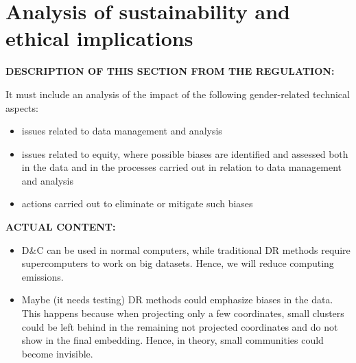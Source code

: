 \section{Analysis of sustainability and ethical implications}

\textbf{DESCRIPTION OF THIS SECTION FROM THE REGULATION:}

It must include an analysis of the impact of the following gender-related technical aspects:
\begin{itemize}
    \item issues related to data management and analysis
    \item issues related to equity, where possible biases are identified and assessed both in the data and in the processes carried out in relation to data management and analysis
    \item actions carried out to eliminate or mitigate such biases
\end{itemize}

\textbf{ACTUAL CONTENT:}

\begin{itemize}
    \item D\&C can be used in normal computers, while traditional DR methods require supercomputers to work on big datasets. Hence, we will reduce computing emissions.
    \item Maybe (it needs testing) DR methods could emphasize biases in the data. This happens because when projecting only a few coordinates, small clusters could be left behind in the remaining not projected coordinates and do not show in the final embedding. Hence, in theory, small communities could become invisible.
\end{itemize}